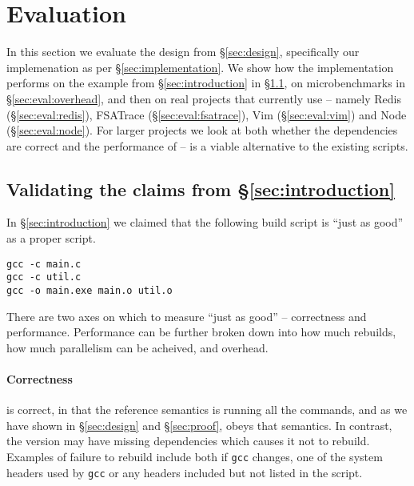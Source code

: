 \section{Evaluation}
\label{sec:evaluation}

In this section we evaluate the design from \S\ref{sec:design}, specifically our implemenation as per \S\ref{sec:implementation}. We show how the implementation performs on the example from \S\ref{sec:introduction} in \S\ref{sec:eval:introduction}, on microbenchmarks in \S\ref{sec:eval:overhead}, and then on real projects that currently use \Make -- namely Redis (\S\ref{sec:eval:redis}), FSATrace (\S\ref{sec:eval:fsatrace}), Vim (\S\ref{sec:eval:vim}) and Node (\S\ref{sec:eval:node}). For larger projects we look at both whether the dependencies are correct and the performance of \Rattle -- is \Rattle a viable alternative to the existing \Make scripts.

\subsection{Validating the claims from \S\ref{sec:introduction}}
\label{sec:eval:introduction}

In \S\ref{sec:introduction} we claimed that the following build script is ``just as good'' as a proper \Make script.

\begin{verbatim}
gcc -c main.c
gcc -c util.c
gcc -o main.exe main.o util.o
\end{verbatim}

There are two axes on which to measure ``just as good'' -- correctness and performance. Performance can be further broken down into how much rebuilds, how much parallelism can be acheived, and overhead.

\paragraph{Correctness} \Rattle is correct, in that the reference semantics is running all the commands, and as we have shown in \S\ref{sec:design} and \S\ref{sec:proof}, \Rattle obeys that semantics. In contrast, the \Make version may have missing dependencies which causes it not to rebuild. Examples of failure to rebuild include both if \texttt{gcc} changes, one of the system headers used by \texttt{gcc} or any headers included but not listed in the \Make script.

